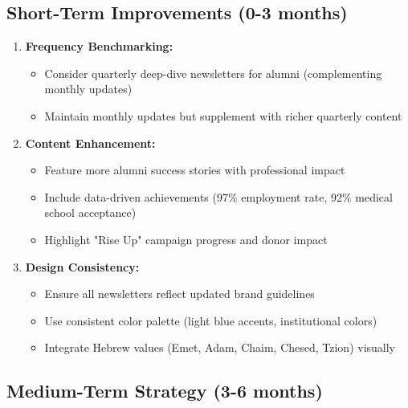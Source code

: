 \documentclass[12pt,letterpaper]{article}
\begin{document}
\subsection{Short-Term Improvements (0-3 months)}

\begin{enumerate}[leftmargin=*]
    \item \textbf{Frequency Benchmarking:}
    \begin{itemize}
        \item Consider quarterly deep-dive newsletters for alumni (complementing monthly updates)
        \item Maintain monthly updates but supplement with richer quarterly content
    \end{itemize}

    \item \textbf{Content Enhancement:}
    \begin{itemize}
        \item Feature more alumni success stories with professional impact
        \item Include data-driven achievements (97\% employment rate, 92\% medical school acceptance)
        \item Highlight "Rise Up" campaign progress and donor impact
    \end{itemize}

    \item \textbf{Design Consistency:}
    \begin{itemize}
        \item Ensure all newsletters reflect updated brand guidelines
        \item Use consistent color palette (light blue accents, institutional colors)
        \item Integrate Hebrew values (Emet, Adam, Chaim, Chesed, Tzion) visually
    \end{itemize}
\end{enumerate}

\subsection{Medium-Term Strategy (3-6 months)}
\end{document}
